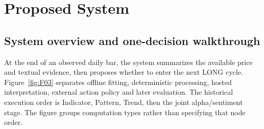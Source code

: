 \chapter{Proposed System}\label{s:9cf7f167cee0404f}
\section{System overview and one-decision walkthrough}\label{s:d04d6247a77e8f69}
At the end of an observed daily bar, the system summarizes the available
price and textual evidence, then proposes whether to enter the next LONG
cycle. Figure~\ref{fig:F03} separates offline fitting, deterministic
processing, hosted interpretation, external action policy and later
evaluation. The historical execution order is Indicator, Pattern, Trend,
then the joint alpha/sentiment stage. The figure groups computation types
rather than specifying that node order.

